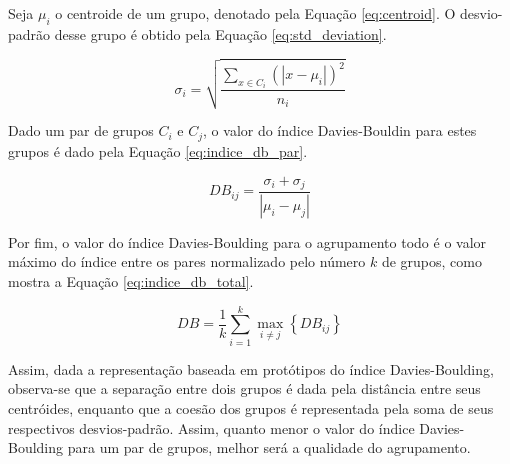 Seja $\mu_i$ o centroide de um grupo, denotado pela Equação \ref{eq:centroid}. 
O desvio-padrão desse grupo é obtido pela Equação \ref{eq:std_deviation}.

\begin{equation}
	\sigma_i = \sqrt{
								\frac
									{
										\sum_{x \in C_i}{ \left( \left| x - \mu_i \right| \right)^2}
									}
									{n_i}
							}
	\label{eq:std_deviation}
\end{equation}

Dado um par de grupos $C_i$ e $C_j$, o valor do índice Davies-Bouldin para estes
grupos é dado pela Equação \ref{eq:indice_db_par}.

\begin{equation}
	DB_{ij} = \frac{\sigma_i + \sigma_j}{\left| \mu_i - \mu_j \right|}
	\label{eq:indice_db_par}
\end{equation}

Por fim, o valor do índice Davies-Boulding para o agrupamento todo é o valor 
máximo do índice entre os pares normalizado pelo número $k$ de grupos, como
mostra a Equação \ref{eq:indice_db_total}.

\begin{equation}
	DB = \frac{1}{k}
			 \sum_{i = 1}^{k}
			 {
					\max_{i \neq j}{\left\{ DB_{ij} \right\}}
			}
	\label{eq:indice_db_total}
\end{equation}
 

Assim, dada a representação baseada em protótipos do índice Davies-Boulding,
observa-se que a separação entre dois grupos é dada pela distância entre seus
centróides, enquanto que a coesão dos grupos é representada pela soma de seus
respectivos desvios-padrão. Assim, quanto menor o valor do índice
Davies-Boulding para um par de grupos, melhor será a qualidade do agrupamento.